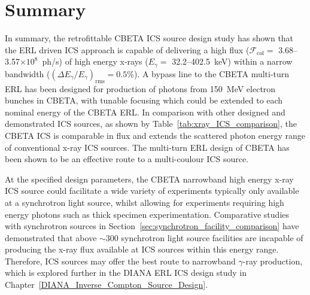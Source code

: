 \documentclass[../main.tex]{subfiles}
\begin{document}
\section{Summary}

In summary, the retrofittable CBETA ICS source design study has shown that the ERL driven ICS approach is capable of delivering a high flux ($\mathcal{F}_{\mathrm{col}} =$ 3.68--3.57$\times 10^{8}$~ph/\si{\second}) of high energy x-rays ($E_{\gamma} =$ 32.2--402.5~\si{\kilo\electronvolt}) within a narrow bandwidth ($\left(\Delta E_{\gamma}/E_{\gamma}\right)_{\mathrm{rms}} = 0.5$\%). A bypass line to the CBETA multi-turn ERL has been designed for production of photons from 150~\si{\mega\electronvolt} electron bunches in CBETA, with tunable focusing which could be extended to each nominal energy of the CBETA ERL. In comparison with other designed and demonstrated ICS sources, as shown by Table~\ref{tab:xray_ICS_comparison}, the CBETA ICS is comparable in flux and extends the scattered photon energy range of conventional x-ray ICS sources. The multi-turn ERL design of CBETA has been shown to be an effective route to a multi-coulour ICS source. 

At the specified design parameters, the CBETA narrowband high energy x-ray ICS source could facilitate a wide variety of experiments typically only available at a synchrotron light source, whilst allowing for experiments requiring high energy photons such as thick specimen experimentation. Comparative studies with synchrotron sources in Section~\ref{sec:synchrotron_facility_comparison} have demonstrated that above $\sim300$ synchrotron light source facilities are incapable of producing the x-ray flux available at ICS sources within this energy range. Therefore, ICS sources may offer the best route to narrowband $\gamma$-ray production, which is explored further in the DIANA ERL ICS design study in Chapter~\ref{DIANA_Inverse_Compton_Source_Design}.
\end{document}
